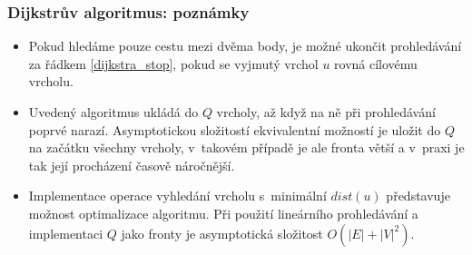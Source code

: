 \documentclass[10pt,xcolor=pdflatex,hyperref={unicode,hidelinks}]{beamer}
\begin{document}
\begin{frame}\frametitle{Dijkstrův algoritmus: poznámky}
    \begin{itemize}
        \item<1-> Pokud hledáme pouze cestu mezi dvěma body, je možné ukončit prohledávání za řádkem \ref{dijkstra_stop}, pokud se vyjmutý vrchol $u$ rovná cílovému vrcholu.
        \item<2-> Uvedený algoritmus ukládá do $Q$ vrcholy, až když na ně při prohledávání poprvé narazí. Asymptotickou složitostí ekvivalentní možností je uložit do $Q$ na začátku všechny vrcholy, v~takovém případě je ale fronta větší a v~praxi je tak její procházení časově náročnější.
        \item<3-> Implementace operace vyhledání vrcholu s~minimální $dist(u)$ představuje možnost optimalizace algoritmu. Při použití lineárního prohledávání a implementaci $Q$ jako fronty je asymptotická složitost $O(|E| + |V|^2)$.
    \end{itemize}
\end{frame}
\end{document}
